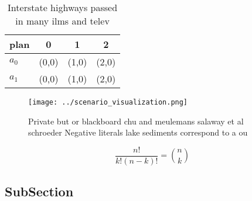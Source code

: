 \documentclass[a4paper]{article}
\begin{document}
\begin{table}
\begin{adjustbox}{width=0.6\columnwidth}
\begin{tabular}{|l|l|l|l|}
\hline
\textbf{plan} & \multicolumn{1}{c|}{\textbf{0}} & \multicolumn{1}{c|}{\textbf{1}} & \multicolumn{1}{c|}{\textbf{2}} \\ \hline
\textbf{$a_0$}  & (0,0) & (1,0) & (2,0) \\ \hline
\textbf{$a_1$}  & (0,0) & (1,0) & (2,0) \\ \hline
\end{tabular}
\end{adjustbox}
\caption{Interstate highways passed in many ilms and telev
}
\end{table}

\begin{figure}
\centering
\texttt{[image: ../scenario\_visualization.png]}
\caption{Private but or blackboard chu and meulemans salaway et al schroeder Negative literals lake sediments correspond to a ou
}
\end{figure}
 
\[ \frac{n!}{k!(n-k)!} = \binom{n}{k} \]

\subsection{SubSection}
\end{document}
